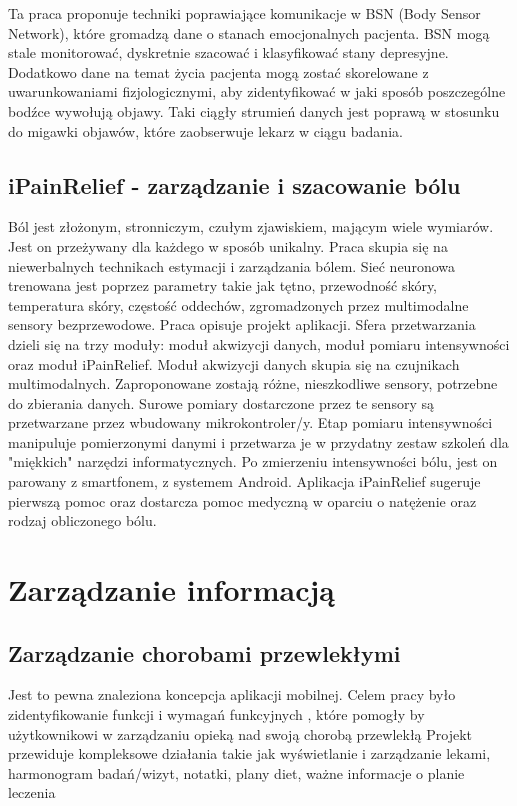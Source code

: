 Ta praca proponuje techniki poprawiające komunikacje w BSN (Body Sensor Network), które gromadzą dane o stanach emocjonalnych pacjenta. BSN  mogą stale monitorować, dyskretnie szacować i klasyfikować stany depresyjne. Dodatkowo dane na temat życia pacjenta mogą zostać skorelowane z uwarunkowaniami fizjologicznymi, aby zidentyfikować w jaki sposób poszczególne bodźce wywołują objawy. Taki ciągły strumień danych jest poprawą w stosunku do migawki objawów, które zaobserwuje lekarz w ciągu badania. 

\subsection{iPainRelief - zarządzanie i szacowanie bólu \cite{6508301}}
Ból jest złożonym, stronniczym, czułym zjawiskiem, mającym wiele wymiarów. Jest on przeżywany dla każdego w sposób unikalny. Praca skupia się na niewerbalnych technikach estymacji i zarządzania bólem. Sieć neuronowa trenowana jest poprzez parametry takie jak tętno, przewodność skóry, temperatura skóry, częstość oddechów, zgromadzonych przez multimodalne sensory bezprzewodowe. Praca opisuje projekt aplikacji. Sfera przetwarzania dzieli się na trzy moduły: moduł akwizycji danych, moduł pomiaru intensywności oraz moduł iPainRelief. Moduł akwizycji danych skupia się na czujnikach multimodalnych. Zaproponowane zostają różne, nieszkodliwe sensory, potrzebne do zbierania danych. Surowe pomiary dostarczone przez te sensory są przetwarzane przez wbudowany mikrokontroler/y. Etap pomiaru intensywności manipuluje pomierzonymi danymi i przetwarza je w przydatny zestaw szkoleń dla "miękkich" narzędzi informatycznych. Po zmierzeniu intensywności bólu, jest on parowany z smartfonem, z systemem Android. Aplikacja iPainRelief sugeruje pierwszą pomoc oraz dostarcza pomoc medyczną w oparciu o natężenie oraz rodzaj obliczonego bólu.
 


\section{Zarządzanie informacją}
\label{sec:zarzadz_inf}

\subsection{Zarządzanie chorobami przewlekłymi \cite{6828104}}
Jest to pewna znaleziona koncepcja aplikacji mobilnej. Celem pracy było zidentyfikowanie funkcji i wymagań funkcyjnych , które pomogły by użytkownikowi w zarządzaniu opieką nad swoją chorobą przewlekłą
 Projekt przewiduje kompleksowe działania takie jak wyświetlanie i zarządzanie lekami, harmonogram badań/wizyt, notatki, plany diet, ważne informacje o planie leczenia


